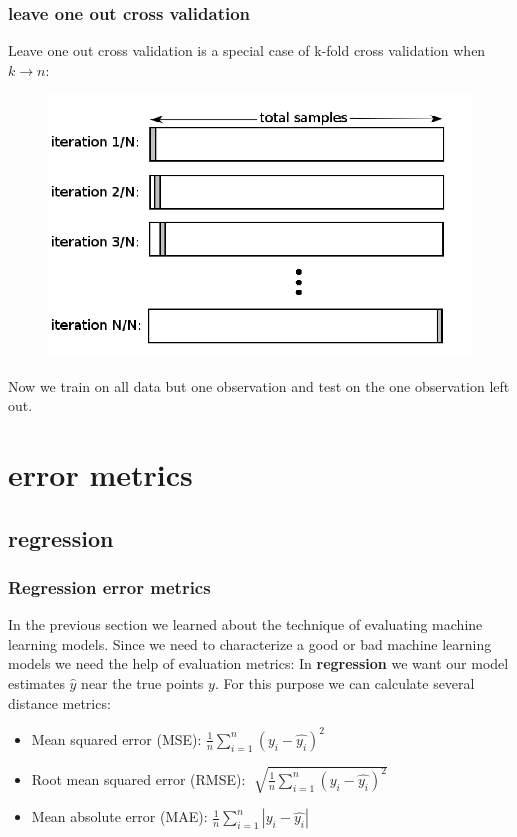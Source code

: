 \documentclass{beamer}
\begin{document}
\begin{frame}
\frametitle{leave one out cross validation}
Leave one out cross validation is a special case of k-fold cross validation when $k \rightarrow n$:
\begin{figure}
\includegraphics[width = 0.7\linewidth]{figures/03/Leave-One-Out-Cross-Validation.png}
\end{figure}
Now we train on all data but one observation and test on the one observation left out.
\end{frame}


\section{error metrics}
\subsection{regression}
\begin{frame}
\frametitle{Regression error metrics}
In the previous section we learned about the technique of evaluating machine learning models. Since we need to characterize a good or bad machine learning models we need the help of evaluation metrics:
\newline
\newline
In \textbf{regression} we want our model estimates $\hat{y}$ near the true points $y$. For this purpose we can calculate several distance metrics:
\newline
\begin{itemize}
\item Mean squared error (MSE): $\frac{1}{n} \sum_{i=1}^n (y_i - \hat{y_i})^2$
\item Root mean squared error (RMSE): $\sqrt[]{\frac{1}{n} \sum_{i=1}^n (y_i - \hat{y_i})^2} $
\item Mean absolute error (MAE): $\frac{1}{n} \sum_{i=1}^n |y_i - \hat{y_i}|$
\end{itemize}

\end{frame}
\end{document}
